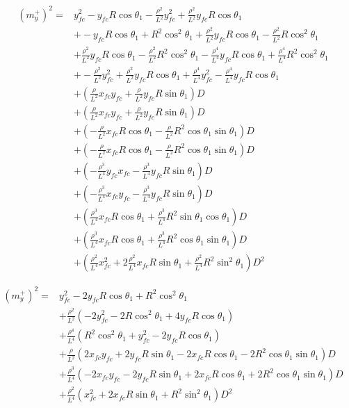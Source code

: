 \documentclass[12pt]{article}
\begin{document}
\begin{align}
    (m^+_y)^2 =& y_{fc}^2 -y_{fc}R\cos\theta_1 -\frac{\rho^2}{L^2}y_{fc}^2 +\frac{\rho^2}{L^2}y_{fc}R\cos\theta_1 \nonumber\\
    &+ -y_{fc}R\cos\theta_1 +R^2\cos^2\theta_1 +\frac{\rho^2}{L^2}y_{fc}R\cos\theta_1 -\frac{\rho^2}{L^2}R\cos^2\theta_1\nonumber\\
    &+ \frac{\rho^2}{L^2}y_{fc}R\cos\theta_1 -\frac{\rho^2}{L^2}R^2\cos^2\theta_1 -\frac{\rho^4}{L^4}y_{fc}R\cos\theta_1 +\frac{\rho^4}{L^4}R^2\cos^2\theta_1 \nonumber\\
    &+  -\frac{\rho^2}{L^2}y_{fc}^2 +\frac{\rho^2}{L^2}y_{fc}R\cos\theta_1 +\frac{\rho^4}{L^4}y_{fc}^2 -\frac{\rho^4}{L^4}y_{fc}R\cos\theta_1 \nonumber\\
    &+ (\frac{\rho}{L^2}x_{fc}y_{fc} + \frac{\rho}{L^2}y_{fc}R\sin\theta_1)D \nonumber\\
    &+ (\frac{\rho}{L^2}x_{fc}y_{fc} + \frac{\rho}{L^2}y_{fc}R\sin\theta_1)D \nonumber\\
    &+ (-\frac{\rho}{L^2}x_{fc}R\cos\theta_1 -\frac{\rho}{L^2}R^2\cos\theta_1\sin\theta_1)D \nonumber\\
    &+ (-\frac{\rho}{L^2}x_{fc}R\cos\theta_1 - \frac{\rho}{L^2}R^2\cos\theta_1\sin\theta_1)D \nonumber\\
    &+ (-\frac{\rho^3}{L^4}y_{fc}x_{fc} -\frac{\rho^3}{L^4}y_{fc}R\sin\theta_1)D \nonumber\\
    &+ (-\frac{\rho^3}{L^4}x_{fc}y_{fc} - \frac{\rho^3}{L^4}y_{fc}R\sin\theta_1)D \nonumber\\
    &+ (\frac{\rho^3}{L^4}x_{fc}R\cos\theta_1 + \frac{\rho^3}{L^4}R^2\sin\theta_1\cos\theta_1)D \nonumber\\
    &+ (\frac{\rho^3}{L^4}x_{fc}R\cos\theta_1 + \frac{\rho^3}{L^4}R^2\cos\theta_1\sin\theta_1)D \nonumber\\
    &+ (\frac{\rho^2}{L^4}x_{fc}^2 + 2\frac{\rho^2}{L^4}x_{fc}R\sin\theta_1 + \frac{\rho^2}{L^4}R^2\sin^2\theta_1)D^2
\end{align}

\begin{align}
    (m^+_y)^2 =& y_{fc}^2 -2y_{fc}R\cos\theta_1 + R^2\cos^2\theta_1\nonumber\\
    &+ \frac{\rho^2}{L^2}(-2y_{fc}^2  -2R\cos^2\theta_1 + 4y_{fc}R\cos\theta_1) \nonumber\\
    &+\frac{\rho^4}{L^4}(R^2\cos^2\theta_1 + y_{fc}^2 -2y_{fc}R\cos\theta_1) \nonumber\\
    &+ \frac{\rho}{L^2}(2x_{fc}y_{fc} + 2y_{fc}R\sin\theta_1  -2x_{fc}R\cos\theta_1 -2R^2\cos\theta_1\sin\theta_1)D \nonumber\\
    &+ \frac{\rho^3}{L^4}(- 2x_{fc}y_{fc} - 2y_{fc}R\sin\theta_1 + 2x_{fc}R\cos\theta_1 + 2R^2\cos\theta_1\sin\theta_1)D \nonumber\\
    &+ \frac{\rho^2}{L^4}(x_{fc}^2 + 2x_{fc}R\sin\theta_1 + R^2\sin^2\theta_1)D^2
\end{align}
\end{document}
